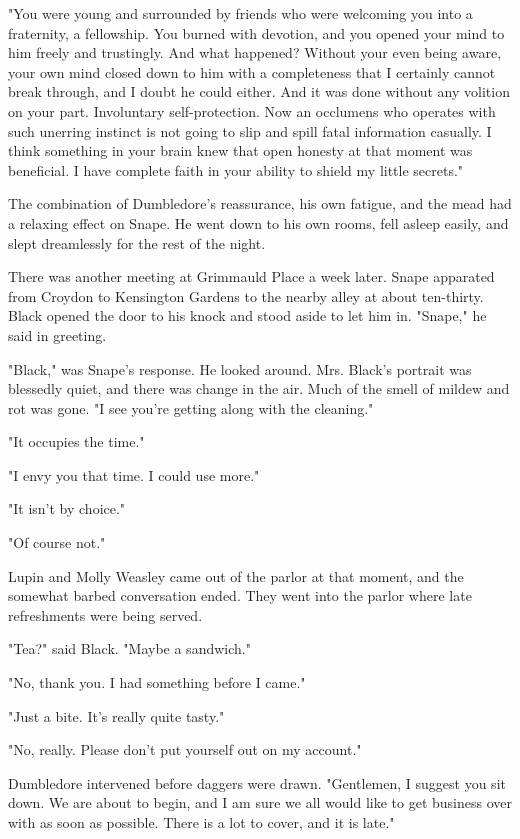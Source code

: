 \documentclass[a4paper,11pt]{article}
\begin{document}
"You were young and surrounded by friends who were welcoming you into a fraternity, a fellowship. You burned with devotion, and you opened your mind to him freely and trustingly. And what happened? Without your even being aware, your own mind closed down to him with a completeness that I certainly cannot break through, and I doubt he could either. And it was done without any volition on your part. Involuntary self-protection. Now an occlumens who operates with such unerring instinct is not going to slip and spill fatal information casually. I think something in your brain knew that open honesty at that moment was beneficial. I have complete faith in your ability to shield my little secrets."

The combination of Dumbledore's reassurance, his own fatigue, and the mead had a relaxing effect on Snape. He went down to his own rooms, fell asleep easily, and slept dreamlessly for the rest of the night.

There was another meeting at Grimmauld Place a week later. Snape apparated from Croydon to Kensington Gardens to the nearby alley at about ten-thirty. Black opened the door to his knock and stood aside to let him in. "Snape," he said in greeting.

"Black," was Snape's response. He looked around. Mrs. Black's portrait was blessedly quiet, and there was change in the air. Much of the smell of mildew and rot was gone. "I see you're getting along with the cleaning."

"It occupies the time."

"I envy you that time. I could use more."

"It isn't by choice."

"Of course not."

Lupin and Molly Weasley came out of the parlor at that moment, and the somewhat barbed conversation ended. They went into the parlor where late refreshments were being served.

"Tea?" said Black. "Maybe a sandwich."

"No, thank you. I had something before I came."

"Just a bite. It's really quite tasty."

"No, really. Please don't put yourself out on my account."

Dumbledore intervened before daggers were drawn. "Gentlemen, I suggest you sit down. We are about to begin, and I am sure we all would like to get business over with as soon as possible. There is a lot to cover, and it is late."
\end{document}
